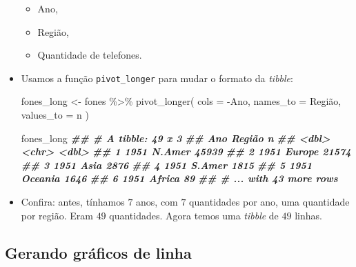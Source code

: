 \documentclass[
  11pt]{report}
\newenvironment{Shaded}{\begin{snugshade}}{\end{snugshade}}
\newcommand{\AttributeTok}[1]{\textcolor[rgb]{0.77,0.63,0.00}{#1}}
\newcommand{\DocumentationTok}[1]{\textcolor[rgb]{0.56,0.35,0.01}{\textbf{\textit{#1}}}}
\newcommand{\FunctionTok}[1]{\textcolor[rgb]{0.00,0.00,0.00}{#1}}
\newcommand{\NormalTok}[1]{#1}
\newcommand{\OtherTok}[1]{\textcolor[rgb]{0.56,0.35,0.01}{#1}}
\newcommand{\SpecialCharTok}[1]{\textcolor[rgb]{0.00,0.00,0.00}{#1}}
\newcommand{\StringTok}[1]{\textcolor[rgb]{0.31,0.60,0.02}{#1}}
\renewenvironment{Shaded}{
    \begin{mdframed}[%
      roundcorner=2pt,%
      innerleftmargin=5pt,%
      innerrightmargin=5pt,%
      topline=true,%
      leftline=true,%
      rightline=true,%
      bottomline=true,%
      linewidth=0.5pt,%
      linecolor=black!20,%
      backgroundcolor=black!2,%
      skipabove=2ex,%
      skipbelow=2.5ex%
    ]%
  }
  {
    \end{mdframed}
  }
\begin{document}
\begin{itemize}
  \begin{itemize}
  \item
    Ano,
  \item
    Região,
  \item
    Quantidade de telefones.
  \end{itemize}
\item
  Usamos a função \texttt{pivot\_longer} para mudar o formato da \emph{tibble}:

\begin{Shaded}
\begin{Highlighting}[]
\NormalTok{fones\_long }\OtherTok{\textless{}{-}}\NormalTok{ fones }\SpecialCharTok{\%\textgreater{}\%} 
  \FunctionTok{pivot\_longer}\NormalTok{(}
    \AttributeTok{cols =} \SpecialCharTok{{-}}\NormalTok{Ano,}
    \AttributeTok{names\_to =} \StringTok{\textquotesingle{}Região\textquotesingle{}}\NormalTok{,}
    \AttributeTok{values\_to =} \StringTok{\textquotesingle{}n\textquotesingle{}}
\NormalTok{  )}

\NormalTok{fones\_long}
\DocumentationTok{\#\# \# A tibble: 49 x 3}
\DocumentationTok{\#\#     Ano Região      n}
\DocumentationTok{\#\#   \textless{}dbl\textgreater{} \textless{}chr\textgreater{}   \textless{}dbl\textgreater{}}
\DocumentationTok{\#\# 1  1951 N.Amer  45939}
\DocumentationTok{\#\# 2  1951 Europe  21574}
\DocumentationTok{\#\# 3  1951 Asia     2876}
\DocumentationTok{\#\# 4  1951 S.Amer   1815}
\DocumentationTok{\#\# 5  1951 Oceania  1646}
\DocumentationTok{\#\# 6  1951 Africa     89}
\DocumentationTok{\#\# \# ... with 43 more rows}
\end{Highlighting}
\end{Shaded}
\item
  Confira: antes, tínhamos $7$ anos, com $7$ quantidades por ano, uma quantidade por região. Eram $49$ quantidades. Agora temos uma \emph{tibble} de $49$ linhas.
\end{itemize}

\hypertarget{gerando-gruxe1ficos-de-linha}{%
\subsection{Gerando gráficos de linha}\label{gerando-gruxe1ficos-de-linha}}
\end{document}
